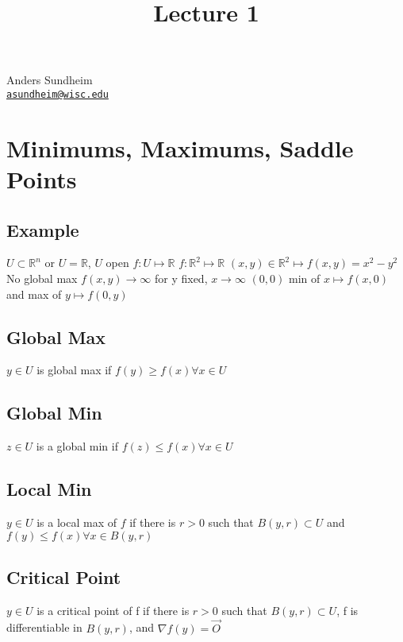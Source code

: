 \documentclass[12pt]{article}
\title{Lecture 1}
\newcommand{\BR}{\mathbb R}
\begin{document}
\maketitle
\vspace*{-0.25in}
\begin{center}
	Anders Sundheim \\
	\href{mailto:asundheim@wisc.edu}{{\tt asundheim@wisc.edu}}
\end{center}

\section{Minimums, Maximums, Saddle Points}
\subsection{Example}
$U\subset\BR^n$ or $U=\BR$, $U$ open
\newline
$f: U\mapsto\BR$
\newline
$f:\BR^2\mapsto\BR$
\newline
$(x,y)\in\BR^2\mapsto f(x,y)=x^2-y^2$
\newline
No global max
\newline
$f(x,y)\rightarrow\infty$ for y fixed, $x\rightarrow\infty$
\newline
$(0,0)$ min of $x\mapsto f(x,0)$ and max of $y\mapsto f(0,y)$

\subsection{Global Max}
$y\in U$ is global max if $f(y)\geq f(x)\forall x\in U$
\subsection{Global Min}
 $z\in U$ is a global min if $f(z) \leq f(x) \forall x\in U$
 \subsection{Local Min}
 $y\in U$ is a local max of $f$ if there is $r>0$ such that $B(y,r)\subset U$ and \newline$f(y)\leq f(x)\forall x\in B(y, r)$
 \subsection{Critical Point}
 $y\in U$ is a critical point of f if there is $r>0$ such that $B(y, r)\subset U$, f is differentiable in $B(y, r)$, and $\nabla f(y) = \vec{O}$
\end{document}

